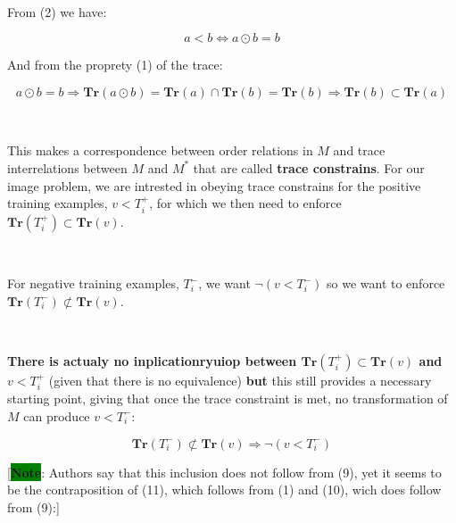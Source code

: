 \documentclass[a4paper, 11pt]{article}
\begin{document}
\

From (2) we have:

\begin{equation*}
    a < b \Leftrightarrow a \odot b = b
\end{equation*}

And from the proprety (1) of the trace:

\begin{equation*}
    a \odot b = b \Rightarrow \textbf{Tr}(a \odot b) = \textbf{Tr}(a) \cap \textbf{Tr}(b) = \textbf{Tr}(b)
    \Rightarrow \textbf{Tr}(b) \subset \textbf{Tr}(a)
\end{equation*}

\

This makes a correspondence between order relations in $M$ and trace interrelations between $M$ and $M^{\ast}$ that are called \textbf{trace constrains}. For our image problem, we are intrested in obeying trace constrains for the positive training examples, $v < T_i^+$, for which we then need to enforce $\textbf{Tr}(T_i^+) \subset \textbf{Tr}(v)$.

\

For negative training examples, $T_i^-$, we want $\neg(v < T_i^-)$ so we want to enforce $\textbf{Tr}(T_i^-) \not\subset \textbf{Tr}(v)$.

\

\textbf{There is actualy no inplicationryuiop between $\textbf{Tr}(T_i^+) \subset \textbf{Tr}(v)$ and $v < T_i^+$} (given that there is no equivalence) \textbf{but} this still provides a necessary starting point, giving that once the trace constraint is met, no transformation of $M$ can produce $v < T_i^-$:

\begin{equation}
    \textbf{Tr}(T_i^-) \not\subset \textbf{Tr}(v) \Rightarrow \neg(v < T_i^-)
\end{equation}

[\colorbox{green}{\textbf{Note}}: Authors say that this inclusion does not follow from (9), yet it seems to be the contraposition of (11), which follows from (1) and (10), wich does follow from (9):]

\

\
\end{document}
